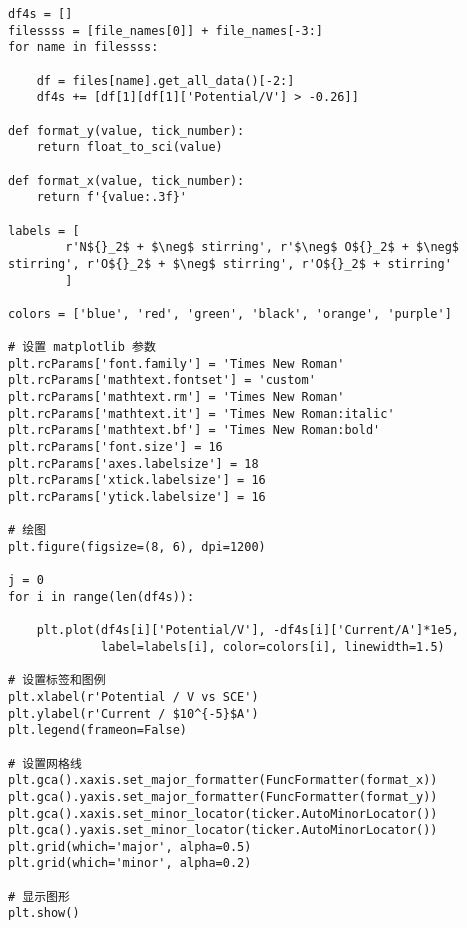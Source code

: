 \begin{verbatim}
df4s = []
filessss = [file_names[0]] + file_names[-3:]
for name in filessss:

    df = files[name].get_all_data()[-2:]
    df4s += [df[1][df[1]['Potential/V'] > -0.26]]

def format_y(value, tick_number):
    return float_to_sci(value)

def format_x(value, tick_number):
    return f'{value:.3f}'

labels = [
        r'N${}_2$ + $\neg$ stirring', r'$\neg$ O${}_2$ + $\neg$ stirring', r'O${}_2$ + $\neg$ stirring', r'O${}_2$ + stirring'
        ]

colors = ['blue', 'red', 'green', 'black', 'orange', 'purple']

# 设置 matplotlib 参数
plt.rcParams['font.family'] = 'Times New Roman'
plt.rcParams['mathtext.fontset'] = 'custom'
plt.rcParams['mathtext.rm'] = 'Times New Roman'
plt.rcParams['mathtext.it'] = 'Times New Roman:italic'
plt.rcParams['mathtext.bf'] = 'Times New Roman:bold'
plt.rcParams['font.size'] = 16
plt.rcParams['axes.labelsize'] = 18
plt.rcParams['xtick.labelsize'] = 16
plt.rcParams['ytick.labelsize'] = 16

# 绘图
plt.figure(figsize=(8, 6), dpi=1200)

j = 0
for i in range(len(df4s)):

    plt.plot(df4s[i]['Potential/V'], -df4s[i]['Current/A']*1e5, 
             label=labels[i], color=colors[i], linewidth=1.5)

# 设置标签和图例
plt.xlabel(r'Potential / V vs SCE')
plt.ylabel(r'Current / $10^{-5}$A')
plt.legend(frameon=False)

# 设置网格线
plt.gca().xaxis.set_major_formatter(FuncFormatter(format_x))
plt.gca().yaxis.set_major_formatter(FuncFormatter(format_y))
plt.gca().xaxis.set_minor_locator(ticker.AutoMinorLocator())
plt.gca().yaxis.set_minor_locator(ticker.AutoMinorLocator())
plt.grid(which='major', alpha=0.5)
plt.grid(which='minor', alpha=0.2)

# 显示图形
plt.show()
\end{verbatim}

